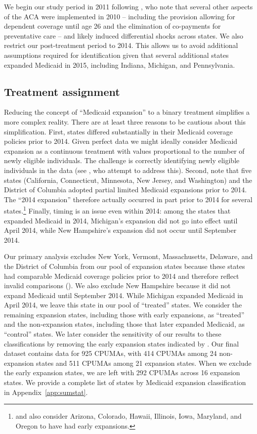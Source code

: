 \documentclass[aoas]{imsart}
\theoremstyle{plain}
\theoremstyle{remark}
\begin{document}
We begin our study period in 2011 following \cite{courtemanche2017early}, who note that several other aspects of the ACA were implemented in 2010 -- including the provision allowing for dependent coverage until age 26 and the elimination of co-payments for preventative care -- and likely induced differential shocks across states. We also restrict our post-treatment period to 2014. This allows us to avoid additional assumptions required for identification given that several additional states expanded Medicaid in 2015, including Indiana, Michigan, and Pennsylvania.

\subsection{Treatment assignment} \label{sssec:txassign}

Reducing the concept of ``Medicaid expansion'' to a binary treatment simplifies a more complex reality. There are at least three reasons to be cautious about this simplification. First, states differed substantially in their Medicaid coverage policies prior to 2014. Given perfect data we might ideally consider Medicaid expansion as a continuous treatment with values proportional to the number of newly eligible individuals. The challenge is correctly identifying newly eligible individuals in the data (see \cite{frean2017premium}, who attempt to address this). Second, \cite{frean2017premium} note that five states (California, Connecticut, Minnesota, New Jersey, and Washington) and the District of Columbia adopted partial limited Medicaid expansions prior to 2014. The ``2014 expansion'' therefore actually occurred in part prior to 2014 for several states.\footnote{\cite{kaestner2017effects} and \cite{courtemanche2017early} also consider Arizona, Colorado, Hawaii, Illinois, Iowa, Maryland, and Oregon to have had early expansions.} Finally, timing is an issue even within 2014: among the states that expanded Medicaid in 2014, Michigan's expansion did not go into effect until April 2014, while New Hampshire's expansion did not occur until September 2014.

Our primary analysis excludes New York, Vermont, Massachusetts, Delaware, and the District of Columbia from our pool of expansion states because these states had comparable Medicaid coverage policies prior to 2014 and therefore reflect invalid comparisons (\cite{kaestner2017effects}). We also exclude New Hampshire because it did not expand Medicaid until September 2014. While Michigan expanded Medicaid in April 2014, we leave this state in our pool of ``treated'' states. We consider the remaining expansion states, including those with early expansions, as ``treated'' and the non-expansion states, including those that later expanded Medicaid, as ``control'' states. We later consider the sensitivity of our results to these classifications by removing the early expansion states indicated by \cite{frean2017premium}. Our final dataset contains data for 925 CPUMAs, with 414 CPUMAs among 24 non-expansion states and 511 CPUMAs among 21 expansion states. When we exclude the early expansion states, we are left with 292 CPUMAs across 16 expansion states. We provide a complete list of states by Medicaid expansion classification in Appendix~\ref{app:sumstat}.
\end{document}
